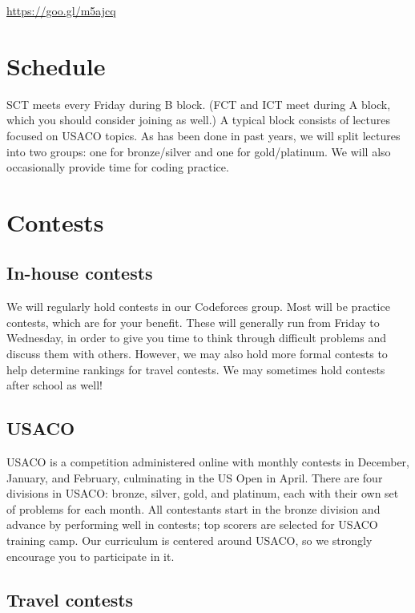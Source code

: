 \documentclass{article}
\begin{document}
\begin{center}
\Large{\url{https://goo.gl/m5ajcq}}
\end{center}


\section{Schedule}

SCT meets every Friday during B block. (FCT and ICT meet during A block, which you should consider joining as well.) A typical block consists of lectures focused on USACO topics. As has been done in past years, we will split lectures into two groups: one for bronze/silver and one for gold/platinum. We will also occasionally provide time for coding practice.


\section{Contests}

\subsection{In-house contests}

We will regularly hold contests in our Codeforces group. Most will be practice contests, which are for your benefit. These will generally run from Friday to Wednesday, in order to give you time to think through difficult problems and discuss them with others. However, we may also hold more formal contests to help determine rankings for travel contests. We may sometimes hold contests after school as well!

\subsection{USACO}

USACO is a competition administered online with monthly contests in December, January, and February, culminating in the US Open in April. There are four divisions in USACO: bronze, silver, gold, and platinum, each with their own set of problems for each month. All contestants start in the bronze division and advance by performing well in contests; top scorers are selected for USACO training camp. Our curriculum is centered around USACO, so we strongly encourage you to participate in it.


\subsection{Travel contests}
\end{document}
